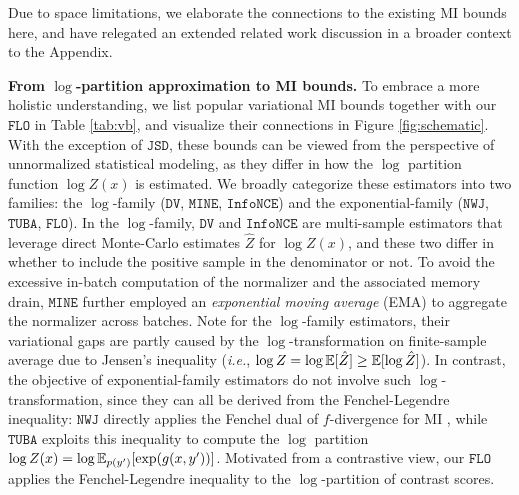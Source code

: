 \documentclass{article}
\theoremstyle{plain}
\theoremstyle{definition}
\theoremstyle{remark}
\newcommand{\infonce}{\texttt{InfoNCE}}
\newcommand{\TUBA}{\texttt{TUBA}}
\newcommand{\NWJ}{\texttt{NWJ}}
\newcommand{\DV}{\texttt{DV}}
\newcommand{\MINE}{\texttt{MINE}}
\newcommand{\FLO}{\texttt{FLO}}
\renewcommand{\JSD}{\texttt{JSD}}
\begin{document}
		Due to space limitations, we elaborate the connections to the existing MI bounds here, and have relegated an extended related work discussion in a broader context to the Appendix. 
		
		{\bf From $\log$-partition approximation to MI bounds.} To embrace a more holistic understanding, we list popular variational MI bounds together with our $\FLO$ in Table \ref{tab:vb}, and visualize their connections in Figure \ref{fig:schematic}. With the exception of $\JSD$, these bounds can be viewed from the perspective of unnormalized statistical modeling, as they differ in how the $\log$ partition function $\log Z(x)$ is estimated. We broadly categorize these estimators into two families: the $\log$-family ($\DV$, $\MINE$, $\infonce$) and the exponential-family ($\NWJ$, $\TUBA$, $\FLO$). In the $\log$-family, $\DV$ and $\infonce$ are multi-sample estimators that leverage direct Monte-Carlo estimates $\hat{Z}$ for $\log Z(x)$, and these two differ in whether to include the positive sample in the denominator or not. To avoid the excessive in-batch computation of the normalizer and the associated memory drain, $\MINE$ further employed an {\it exponential moving average} (EMA) to aggregate the normalizer across batches. Note for the $\log$-family estimators, their variational gaps are partly caused by the $\log$-transformation on finite-sample average due to Jensen's inequality ({\it i.e.}, $\log Z = \log \mathbb{E}[\hat{Z}] \geq \mathbb{E} [\log \hat{Z}]$). In contrast, the objective of exponential-family estimators do not involve such $\log$-transformation, since they can all be derived from the Fenchel-Legendre inequality: $\NWJ$ directly applies the Fenchel dual of $f$-divergence for MI \citep{nowozin2016f}, while $\TUBA$ exploits this inequality to compute the $\log$ partition $\log Z(x) = \log \mathbb{E}_{p(y')}[\exp(g(x,y'))]$. Motivated from a contrastive view, our $\FLO$ applies the Fenchel-Legendre inequality to the $\log$-partition of contrast scores. 
		
\end{document}
